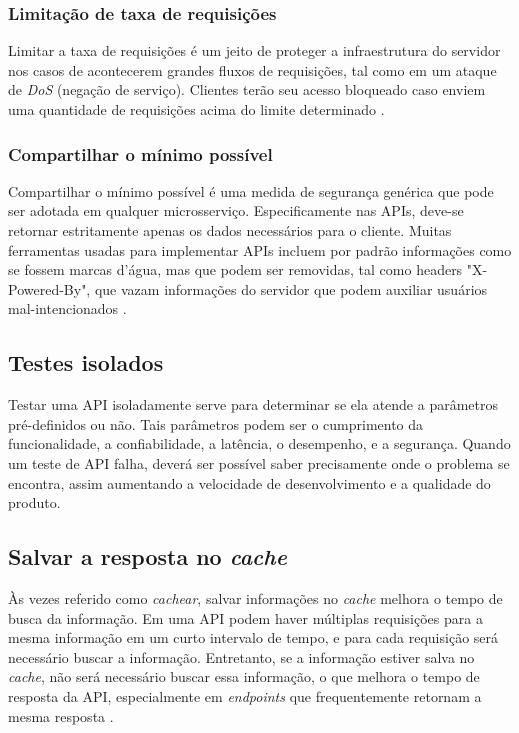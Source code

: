 \subsubsection*{Limitação de taxa de requisições}
Limitar a taxa de requisições é um jeito de proteger a infraestrutura do servidor nos casos de acontecerem grandes fluxos de requisições, tal como em um ataque de \emph{DoS} (negação de serviço). Clientes terão seu acesso bloqueado caso enviem uma quantidade de requisições acima do limite determinado \cite{rapidAPI-twitter}.

\subsubsection*{Compartilhar o mínimo possível}
Compartilhar o mínimo possível é uma medida de segurança genérica que pode ser adotada em qualquer microsserviço. Especificamente nas APIs, deve-se retornar estritamente apenas os dados necessários para o cliente. Muitas ferramentas usadas para implementar APIs incluem por padrão informações como se fossem marcas d'água, mas que podem ser removidas, tal como headers "X-Powered-By", que vazam informações do servidor que podem auxiliar usuários mal-intencionados \cite{rapidAPI-twitter}.

\subsection{Testes isolados}
Testar uma API isoladamente serve para determinar se ela atende a parâmetros pré-definidos ou não. Tais parâmetros podem ser o cumprimento da funcionalidade, a confiabilidade, a latência, o desempenho, e a segurança. Quando um teste de API falha, deverá ser possível saber precisamente onde o problema se encontra, assim aumentando a velocidade de desenvolvimento e a qualidade do produto.


\subsection{Salvar a resposta no \emph{cache}}
Às vezes referido como \emph{cachear}, salvar informações no \emph{cache} melhora o tempo de busca da informação. Em uma API podem haver múltiplas requisições para a mesma informação em um curto intervalo de tempo, e para cada requisição será necessário buscar a informação. Entretanto, se a informação estiver salva no \emph{cache}, não será necessário buscar essa informação, o que melhora o tempo de resposta da API, especialmente em \emph{endpoints} que frequentemente retornam a mesma resposta \cite{rapidAPI-twitter}.

